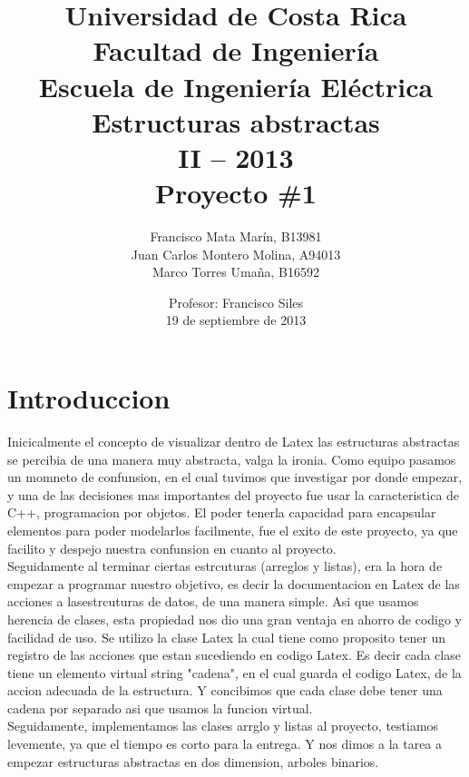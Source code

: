 \documentclass[12pt,letterpaper]{article}     %
\author{Francisco Mata Marín, B13981 \\
		Juan Carlos Montero Molina, A94013 \\
		Marco Torres Umaña, B16592   \vspace {10mm}}
\title{{Universidad de Costa Rica \\ 
		Facultad de Ingeniería \\
		Escuela de Ingeniería Eléctrica \\
		Estructuras abstractas \\
		II – 2013\\  		 
		\vspace* {50mm}			
		 Proyecto \#1 } \vspace* {50mm}}
\date{Profesor: Francisco Siles\\19 de septiembre de 2013}
\begin{document}
	\maketitle							%
	\newpage






 

\section{Introduccion}

Inicicalmente el concepto de visualizar dentro de Latex las estructuras abstractas se percibia de una manera muy abstracta, valga la ironia. Como equipo pasamos un momneto de confunsion, en el cual tuvimos que investigar por donde empezar, y una de las decisiones mas importantes del proyecto fue usar la caracteristica de C++, programacion por objetos. El poder tenerla capacidad para encapsular elementos para poder modelarlos facilmente, fue el exito de este proyecto, ya que facilito y despejo nuestra confunsion en cuanto al proyecto.\\

Seguidamente al terminar ciertas estrcuturas (arreglos y listas), era la hora de empezar a programar nuestro objetivo, es decir la documentacion en Latex de las acciones a lasestrcuturas de datos, de una manera simple. Asi que usamos herencia de clases, esta propiedad nos dio una gran ventaja en ahorro de codigo y facilidad de uso. Se utilizo la clase Latex la cual tiene como proposito tener un registro de las acciones que estan sucediendo en codigo Latex. Es decir cada clase tiene un elemento virtual string "cadena", en el cual guarda el codigo Latex, de la accion adecuada de la estructura. Y concibimos que cada clase debe tener una cadena por separado asi que usamos la funcion virtual.\\

Seguidamente, implementamos las clases arrglo y listas al proyecto, testiamos levemente, ya que el tiempo es corto para la entrega. Y nos dimos a la tarea a empezar estructuras abstractas en dos dimension, arboles binarios.\\
\end{document}
